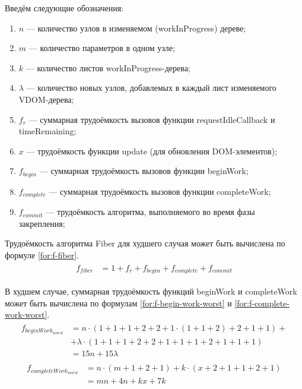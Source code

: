 Введём следующие обозначения:
\begin{enumerate}[label=\arabic*)]
	\item $n$ --- количество узлов в изменяемом (workInProgress) дереве;
	\item $m$ --- количество параметров в одном узле;
	\item $k$ --- количество листов workInProgress-дерева;
	\item $\lambda$ --- количество новых узлов, добавлемых в каждый лист изменяемого VDOM-дерева;
	\item $f_{r}$ --- суммарная трудоёмкость вызовов функции requestIdleCallback и \linebreak timeRemaining;
	\item $x$ --- трудоёмкость функции update (для обновления DOM-элементов);
	\item $f_{begin}$ --- суммарная трудоёмкость вызовов функции beginWork;
	\item $f_{complete}$ --- суммарная трудоёмкость вызовов функции completeWork;
	\item $f_{commit}$ --- трудоёмкость алгоритма, выполняемого во время фазы закрепления;
\end{enumerate}

Трудоёмкость алгоритма Fiber для худшего случая может быть вычислена по формуле \ref{for:f-fiber}.
\begin{align}
	\begin{split}
		\label{for:f-fiber}
		f_{fiber} &= 1 + f_ {r} + f_{begin} + f_{complete} + f_{commit}
	\end{split}
\end{align}

В худшем случае, суммарная трудоёмкость функций beginWork и \linebreak completeWork может быть вычислена по формулам \ref{for:f-begin-work-worst} и \ref{for:f-complete-work-worst}.
\begin{align}
	\begin{split}
		\label{for:f-begin-work-worst}
		f_{beginWork_{worst}} &= n \cdot(1 + 1 + 1 + 2 + 2 + 1 \cdot (1 + 1 + 2) + 2 + 1  + 1) +\\
&+ \lambda \cdot (1 + 1 + 1 + 2 + 2 + 1 + 1 + 1 + 2 + 1 + 1 + 1) \\
&= 15n + 15\lambda 
	\end{split}
\end{align}
\begin{align}
	\begin{split}
		\label{for:f-complete-work-worst}
		f_{completeWork_{worst}} &= n \cdot (m + 1 + 2 + 1) + k \cdot (x + 2 + 1 + 1 + 2 + 1) \\
&= mn + 4n + kx + 7k
	\end{split}
\end{align}

